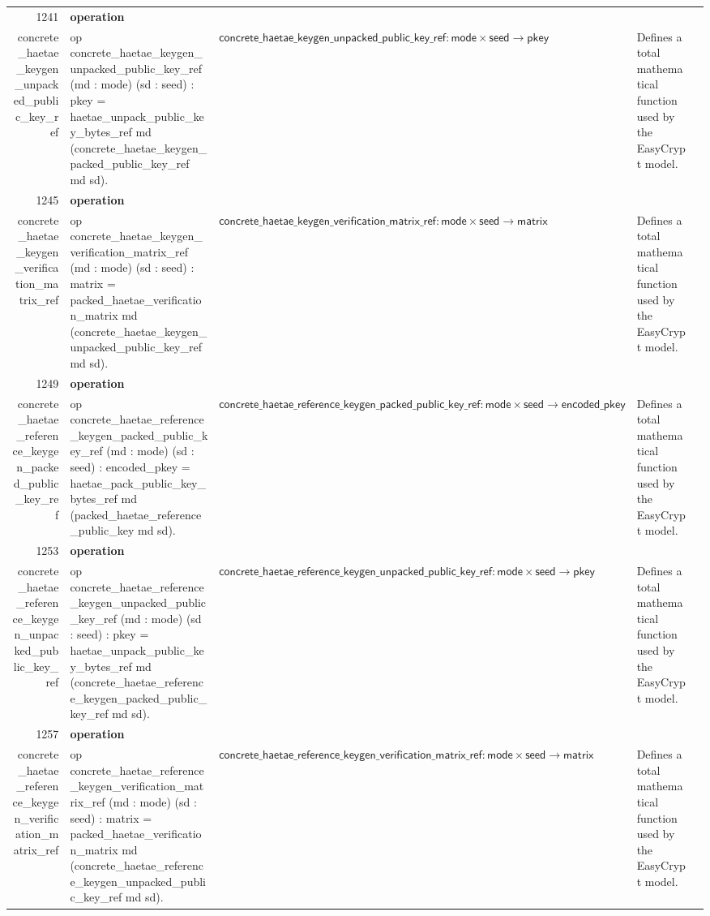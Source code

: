 \documentclass[10pt]{article}
\newcommand{\ec}[1]{\begingroup\ttfamily\scriptsize #1\endgroup}
\begin{document}
\begin{longtable}{r L{0.17\textwidth} L{0.26\textwidth} L{0.27\textwidth} L{0.20\textwidth}}
1241 & \textbf{operation}\\\ec{concrete\_haetae\_keygen\_unpacked\_public\_key\_ref} & \ec{op concrete\_haetae\_keygen\_unpacked\_public\_key\_ref (md : mode) (sd : seed) : pkey = haetae\_unpack\_public\_key\_bytes\_ref md (concrete\_haetae\_keygen\_packed\_public\_key\_ref md sd).} & \(\mathsf{concrete\_haetae\_keygen\_unpacked\_public\_key\_ref} : \mathsf{mode} \times \mathsf{seed} \to \mathsf{pkey}\) & Defines a total mathematical function used by the EasyCrypt model. \\
1245 & \textbf{operation}\\\ec{concrete\_haetae\_keygen\_verification\_matrix\_ref} & \ec{op concrete\_haetae\_keygen\_verification\_matrix\_ref (md : mode) (sd : seed) : matrix = packed\_haetae\_verification\_matrix md (concrete\_haetae\_keygen\_unpacked\_public\_key\_ref md sd).} & \(\mathsf{concrete\_haetae\_keygen\_verification\_matrix\_ref} : \mathsf{mode} \times \mathsf{seed} \to \mathsf{matrix}\) & Defines a total mathematical function used by the EasyCrypt model. \\
1249 & \textbf{operation}\\\ec{concrete\_haetae\_reference\_keygen\_packed\_public\_key\_ref} & \ec{op concrete\_haetae\_reference\_keygen\_packed\_public\_key\_ref (md : mode) (sd : seed) : encoded\_pkey = haetae\_pack\_public\_key\_bytes\_ref md (packed\_haetae\_reference\_public\_key md sd).} & \(\mathsf{concrete\_haetae\_reference\_keygen\_packed\_public\_key\_ref} : \mathsf{mode} \times \mathsf{seed} \to \mathsf{encoded\_pkey}\) & Defines a total mathematical function used by the EasyCrypt model. \\
1253 & \textbf{operation}\\\ec{concrete\_haetae\_reference\_keygen\_unpacked\_public\_key\_ref} & \ec{op concrete\_haetae\_reference\_keygen\_unpacked\_public\_key\_ref (md : mode) (sd : seed) : pkey = haetae\_unpack\_public\_key\_bytes\_ref md (concrete\_haetae\_reference\_keygen\_packed\_public\_key\_ref md sd).} & \(\mathsf{concrete\_haetae\_reference\_keygen\_unpacked\_public\_key\_ref} : \mathsf{mode} \times \mathsf{seed} \to \mathsf{pkey}\) & Defines a total mathematical function used by the EasyCrypt model. \\
1257 & \textbf{operation}\\\ec{concrete\_haetae\_reference\_keygen\_verification\_matrix\_ref} & \ec{op concrete\_haetae\_reference\_keygen\_verification\_matrix\_ref (md : mode) (sd : seed) : matrix = packed\_haetae\_verification\_matrix md (concrete\_haetae\_reference\_keygen\_unpacked\_public\_key\_ref md sd).} & \(\mathsf{concrete\_haetae\_reference\_keygen\_verification\_matrix\_ref} : \mathsf{mode} \times \mathsf{seed} \to \mathsf{matrix}\) & Defines a total mathematical function used by the EasyCrypt model. \\

\end{longtable}
\end{document}
